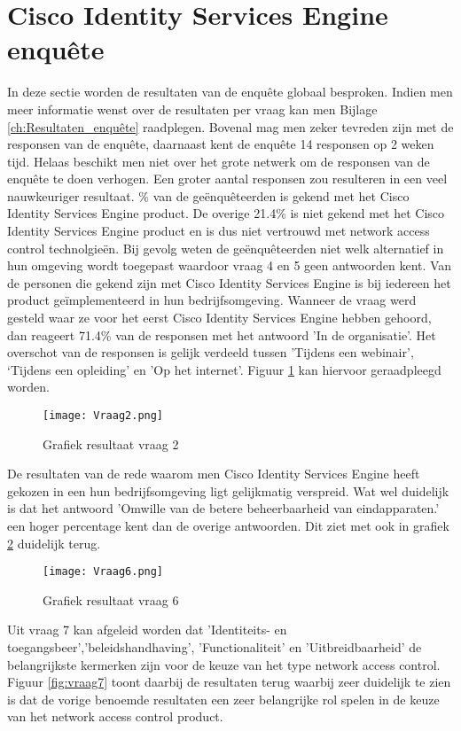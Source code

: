 \section{Cisco Identity Services Engine enquête}
\label{sec:enqueteISe}
In deze sectie worden de resultaten van de enquête globaal besproken. Indien men meer informatie wenst over de resultaten per vraag kan men Bijlage \ref{ch:Resultaten_enquête} raadplegen.
\newline
\newline
Bovenal mag men zeker tevreden zijn met de responsen van de enquête, daarnaast kent de enquête 14 responsen op 2 weken tijd. Helaas beschikt men niet over het grote netwerk om de responsen van de enquête te doen verhogen. Een groter aantal responsen zou resulteren in een veel nauwkeuriger resultaat.  
\newline
{}\% van de geënquêteerden is gekend met het Cisco Identity Services Engine product. De overige 21.4\% is niet gekend met het Cisco Identity Services Engine product en is dus niet vertrouwd met network access control technolgieën. Bij gevolg weten de geënquêteerden niet welk alternatief in hun omgeving wordt toegepast waardoor vraag 4 en 5 geen antwoorden kent. Van de personen die gekend zijn met Cisco Identity Services Engine is bij iedereen het product geïmplementeerd in hun bedrijfsomgeving. Wanneer de vraag werd gesteld waar ze voor het eerst Cisco Identity Services Engine hebben gehoord, dan reageert 71.4\% van de responsen met het antwoord 'In de organisatie'. Het overschot van de responsen is gelijk verdeeld tussen 'Tijdens een webinair', ‘Tijdens een opleiding' en 'Op het internet'. Figuur \ref{fig:vraag2} kan hiervoor geraadpleegd worden. 
\begin{figure}[H]
	\centering
	\texttt{[image: Vraag2.png]}
	\caption{Grafiek resultaat vraag 2}
	\label{fig:vraag2}
\end{figure}
De resultaten van de rede waarom men Cisco Identity Services Engine heeft gekozen in een hun bedrijfsomgeving  ligt gelijkmatig verspreid. Wat wel duidelijk is dat het antwoord 'Omwille van de betere beheerbaarheid van eindapparaten.' een hoger percentage kent dan de overige antwoorden. Dit ziet met ook in grafiek \ref{fig:graf6} duidelijk terug.
\begin{figure}[H]
	\centering
	\texttt{[image: Vraag6.png]}
	\caption{Grafiek resultaat vraag 6}
	\label{fig:graf6}
\end{figure}
Uit vraag 7 kan afgeleid worden dat 'Identiteits- en toegangsbeer','beleidshandhaving', 'Functionaliteit' en 'Uitbreidbaarheid' de belangrijkste kermerken zijn voor de keuze van het type network access control. Figuur \ref{fig:vraag7} toont daarbij de resultaten terug waarbij zeer duidelijk te zien is dat de vorige benoemde resultaten een zeer belangrijke rol spelen in de keuze van het network access control product. 

